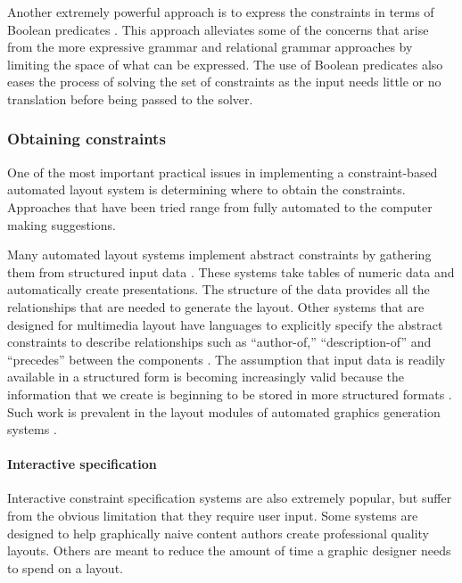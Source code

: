      Another extremely powerful approach is to express the constraints in terms
     of Boolean predicates \citep{graf-1}. This approach alleviates some of the
     concerns that arise from the more expressive grammar and relational grammar
     approaches by limiting the space of what can be expressed. The use of
     Boolean predicates also eases the process of solving the set of constraints
     as the input needs little or no translation before being passed to the
     solver.

    \subsubsection{Obtaining constraints}

     One of the most important practical issues in implementing a
     constraint-based automated layout system is determining where to obtain the
     constraints. Approaches that have been tried range from fully automated to
     the computer making suggestions.

     Many automated layout systems implement abstract constraints by gathering
     them from structured input data
     \citep{mackinlay-1,casner-1,borning-1,beach-1}. These systems take tables
     of numeric data and automatically create presentations. The structure of
     the data provides all the relationships that are needed to generate the
     layout. Other systems that are designed for multimedia layout have
     languages to explicitly specify the abstract constraints to describe
     relationships such as “author-of,” “description-of” and “precedes” between
     the components \citep{weitzman-2,graf-1}. The assumption that input data is
     readily available in a structured form is becoming increasingly valid
     because the information that we create is beginning to be stored in more
     structured formats \citep{bray-1}. Such work is prevalent in the layout
     modules of automated graphics generation systems \citep{zhou-2}.

     \paragraph{Interactive specification}

      Interactive constraint specification systems are also extremely popular,
      but suffer from the obvious limitation that they require user input. Some
      systems are designed to help graphically naive content authors create
      professional quality layouts. Others are meant to reduce the amount of time
      a graphic designer needs to spend on a layout.

